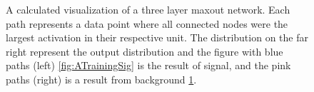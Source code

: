 \begin{figure}
{\begin{subfigure}{.6\textwidth}
        \caption{}
        \label{fig:ATrainingBkg}
    \end{subfigure}
    }
    \caption[A calculated visualization of the activation of a three layer maxout network, after training and displaying the
    signal and background separately.]{A calculated visualization of a three layer maxout network. Each path 
    represents a data point where all connected nodes were the largest activation in their respective 
    unit. The distribution on the far right represent the output distribution and the figure with blue 
    paths (left) \ref{fig:ATrainingSig} is the result of signal, and the pink paths (right) is a result from background 
    \ref{fig:ATrainingBkg}.} 
    \label{fig:NetDist1}
\end{figure}

\begin{figure}
\end{figure}
